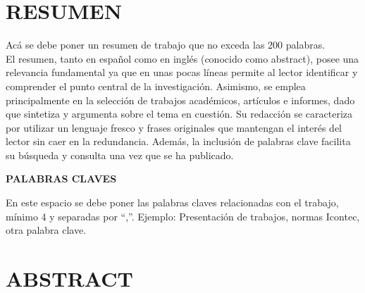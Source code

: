 \documentclass[12pt,a4paper,oneside]{report}
\begin{document}
\newpage
\newpage

\tableofcontents
\cleardoublepage
\makegloss
\newpage


\chapter*{\centering \large RESUMEN} %
\doublespacing

Acá se debe poner un resumen de trabajo que no exceda las 200 palabras. \\

El resumen, tanto en español como en inglés (conocido como abstract), posee una relevancia fundamental ya que en unas pocas líneas permite al lector identificar y comprender el punto central de la investigación. Asimismo, se emplea principalmente en la selección de trabajos académicos, artículos e informes, dado que sintetiza y argumenta sobre el tema en cuestión. Su redacción se caracteriza por utilizar un lenguaje fresco y frases originales que mantengan el interés del lector sin caer en la redundancia. Además, la inclusión de palabras clave facilita su búsqueda y consulta una vez que se ha publicado.

\begin{center}
\textbf{\large PALABRAS CLAVES}
\end{center}

En este espacio se debe poner las palabras claves relacionadas con el trabajo, mínimo 4 y separadas por “,”. Ejemplo: Presentación de trabajos, normas Icontec, otra palabra clave.



\chapter*{\centering \large ABSTRACT}
\end{document}
